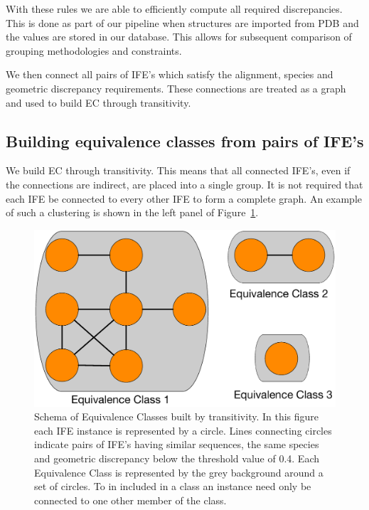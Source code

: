 With these rules we are able to efficiently compute all required discrepancies.
This is done as part of our pipeline when structures are imported from PDB and
the values are stored in our database. This allows for subsequent comparison of
grouping methodologies and constraints.

We then connect all pairs of IFE's which satisfy the alignment, species and
geometric discrepancy requirements. These connections are treated as a graph and
used to build EC through transitivity.

\subsection{Building equivalence classes from pairs of IFE's}

We build EC through transitivity. This means that all connected IFE's, even if
the connections are indirect, are placed into a single group. It is not required
that each IFE be connected to every other IFE to form a complete graph. An
example of such a clustering is shown in the left panel of
Figure~\ref{fig:transitivity}.

\begin{figure}[ht]
  \includegraphics[width=\linewidth]{chapter-3/figs/ife-transtivity}
  \caption{Schema of Equivalence Classes built by transitivity. In this figure
    each IFE instance is represented by a circle. Lines connecting circles
    indicate pairs of IFE's having similar sequences, the same species and
    geometric discrepancy below the threshold value of 0.4. Each Equivalence
  Class is represented by the grey background around a set of circles. To in
included in a class an instance need only be connected to one other member of
the class.}
\label{fig:transitivity}
\end{figure}

